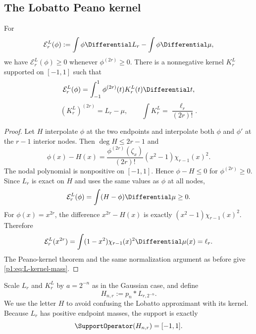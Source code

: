\documentclass[11pt]{article}
\numberwithin{equation}{section}
\theoremstyle{definition}
\theoremstyle{remark}
\begin{document}
\subsection{The Lobatto Peano kernel}

\begin{proposition}
\label{p1:prop:L-kernel}
For
\begin{equation}
 \mathcal E_r^L(\phi):=\int\phi\Differential L_r-\int\phi\Differential\mu,
 \label{p1:eq:L-functional}
\end{equation}
we have $\mathcal E_r^L(\phi)\ge0$ whenever $\phi^{(2r)}\ge0$.  There is a nonnegative kernel $K_r^L$ supported on $[-1,1]$ such that
\begin{equation}
 \mathcal E_r^L(\phi)=\int_{-1}^{1}\phi^{(2r)}(t)K_r^L(t)\Differential t,
 \label{p1:eq:L-Peano}
\end{equation}
\begin{equation}
 (K_r^L)^{(2r)}=L_r-\mu,
 \qquad
 \int K_r^L=\frac{\ell_r}{(2r)!}.
 \label{p1:eq:L-kernel-mass}
\end{equation}
\end{proposition}

\begin{proof}
Let $H$ interpolate $\phi$ at the two endpoints and interpolate both $\phi$ and $\phi'$ at the $r-1$ interior nodes.  Then $\deg H\le2r-1$ and
\begin{equation}
 \phi(x)-H(x)
 =\frac{\phi^{(2r)}(\zeta_x)}{(2r)!}
 (x^2-1)\chi_{r-1}(x)^2.
 \label{p1:eq:L-Hermite-remainder}
\end{equation}
The nodal polynomial is nonpositive on $[-1,1]$.  Hence $\phi-H\le0$ for $\phi^{(2r)}\ge0$.  Since $L_r$ is exact on $H$ and uses the same values as $\phi$ at all nodes,
\[
 \mathcal E_r^L(\phi)=\int(H-\phi)\Differential\mu\ge0.
\]
For $\phi(x)=x^{2r}$, the difference $x^{2r}-H(x)$ is exactly
\((x^2-1)\chi_{r-1}(x)^2\).  Therefore
\[
 \mathcal E_r^L(x^{2r})
 =\int(1-x^2)\chi_{r-1}(x)^2\Differential\mu(x)
 =\ell_r.
\]
The Peano-kernel theorem and the same normalization argument as before give \eqref{p1:eq:L-kernel-mass}.
\end{proof}

Scale $L_r$ and $K_r^L$ by $a=2^{-n}$ as in the Gaussian case, and define
\begin{equation}
 H_{n,r}:=p_n*L_{r,2^{-n}}.
 \label{p1:eq:Hnr}
\end{equation}
We use the letter $H$ to avoid confusing the Lobatto approximant with its kernel.  Because $L_r$ has positive endpoint masses, the support is exactly
\begin{equation}
 \SupportOperator(H_{n,r})=[-1,1].
 \label{p1:eq:H-support}
\end{equation}
\end{document}

